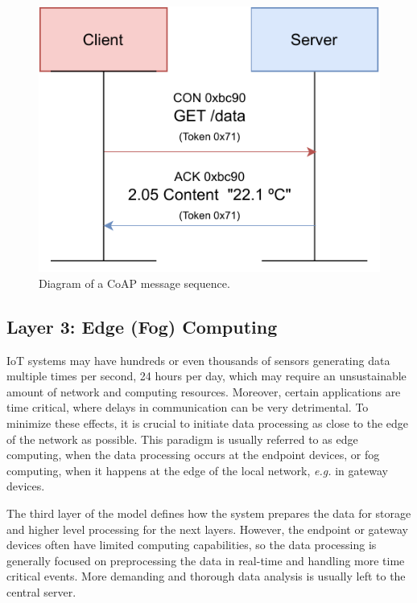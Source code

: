 
 \begin{figure}[H]
    \centering
    \includegraphics[width=0.45\linewidth]{images/coap message sequence diagram.pdf}
    \caption[Diagram of a \acs{CoAP} message sequence.]{ Diagram of a \acs{CoAP} message sequence.}
    \label{fig:coap-message-sequence-diagram}
\end{figure}

\subsection{Layer 3: Edge (Fog) Computing}
\label{sec:iot-model-layer3}

\acs{IoT} systems may have hundreds or even thousands of sensors generating data multiple times per second, 24 hours per day, which may require an unsustainable amount of network and computing resources. Moreover, certain applications are time critical, where delays in communication can be very detrimental. To minimize these effects, it is crucial to initiate data processing as close to the edge of the network as possible. This paradigm is usually referred to as edge computing, when the data processing occurs at the endpoint devices, or fog computing, when it happens at the edge of the local network, \textit{e.g.} in gateway devices. \bigskip

The third layer of the model defines how the system prepares the data for storage and higher level processing for the next layers. However, the endpoint or gateway devices often have limited computing capabilities, so the data processing is generally focused on preprocessing the data in real-time and handling more time critical events. More demanding and thorough data analysis is usually left to the central server. \bigskip


